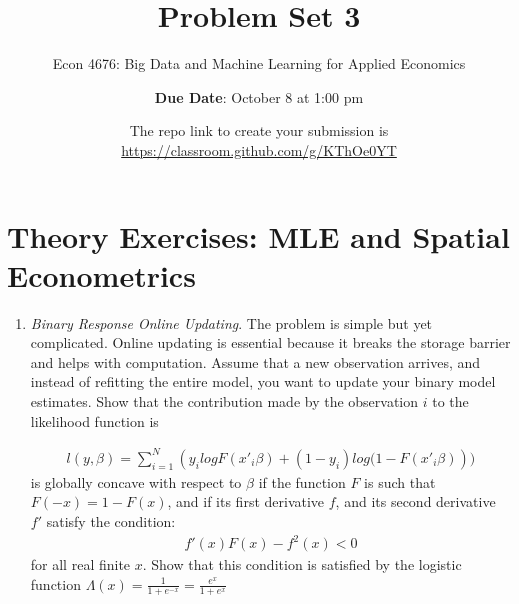 \documentclass[12pt,onecolumn]{article}
\title{Problem Set 3}
\subtitle{Econ 4676: Big Data and Machine Learning for Applied Economics}
\author{{\bf Due Date}: October 8 at 1:00 pm}
\date{}
\date{The repo link to create your submission is \url{https://classroom.github.com/g/KThOe0YT}}
\begin{document}
\maketitle

\section{Theory Exercises: MLE and Spatial Econometrics}

\begin{enumerate}
  
  \item {\it Binary Response Online Updating}. The problem is simple but yet complicated. Online updating is essential because it breaks the storage barrier and helps with computation. Assume that a new observation arrives, and instead of refitting the entire model, you want to update your binary model estimates. Show that the contribution made by the observation $i$ to the likelihood function is

\begin{align}
l(y,\beta) = \sum_{i=1}^N \left( y_i log F(x'_i\beta) + (1-y_i) log (1-F(x'_i\beta)  \right))
\end{align}
  is globally concave with respect to $\beta$ if the function $F$ is such that $F(-x)=1-F(x)$, and if its first derivative $f$, and its second derivative $f'$ satisfy the condition:
  \begin{align}
  f'(x)F(x)-f^2(x)<0
  \end{align}
  for all real finite $x$. Show that this condition is satisfied by the logistic function $\Lambda(x)=\frac{1}{1+e^{-x}}=\frac{e^{x}}{1+e^{x}}$


\end{enumerate}
\end{document}
